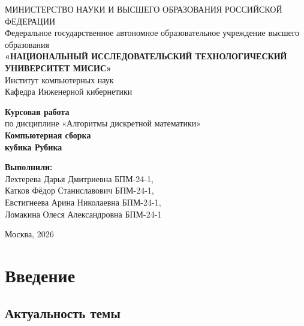 \documentclass{article}
\begin{document}
\begin{titlepage}
    \begin{center}
        \footnotesize
        МИНИСТЕРСТВО НАУКИ И ВЫСШЕГО ОБРАЗОВАНИЯ РОССИЙСКОЙ ФЕДЕРАЦИИ\\
        Федеральное государственное автономное образовательное учреждение высшего образования\\
        \textbf{«НАЦИОНАЛЬНЫЙ ИССЛЕДОВАТЕЛЬСКИЙ ТЕХНОЛОГИЧЕСКИЙ УНИВЕРСИТЕТ МИСИС»}\\
        \vspace{0.5cm}
        Институт компьютерных наук\\
        Кафедра Инженерной кибернетики\\
        
        \vfill
        
        \Large \textbf{Курсовая работа}\\
        \large по дисциплине «Алгоритмы дискретной математики»\\
        \vspace{1cm}
        \huge \textbf{Компьютерная сборка\\ кубика Рубика}
        
        \vfill
    \end{center}
    
    \begin{flushright}
        \large
        \textbf{Выполнили:}\\
        Лехтерева Дарья Дмитриевна БПМ-24-1,\\
        Катков Фёдор Станиславович БПМ-24-1,\\
        Евстигнеева Арина Николаевна БПМ-24-1,\\
        Ломакина Олеся Александровна БПМ-24-1\\
    \end{flushright}
    
    \vfill
    
    \begin{center}
        Москва, 2026
    \end{center}
\end{titlepage}

\newpage
\tableofcontents
\newpage

\section{Введение}
\subsection{Актуальность темы}
\end{document}
